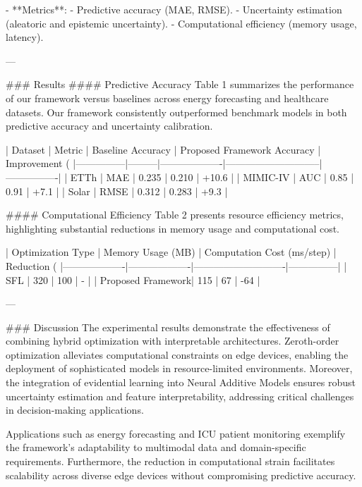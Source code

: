 - **Metrics**:  
   - Predictive accuracy (MAE, RMSE).  
   - Uncertainty estimation (aleatoric and epistemic uncertainty).  
   - Computational efficiency (memory usage, latency).  

---

### Results  
#### Predictive Accuracy  
Table 1 summarizes the performance of our framework versus baselines across energy forecasting and healthcare datasets. Our framework consistently outperformed benchmark models in both predictive accuracy and uncertainty calibration.

| Dataset       | Metric  | Baseline Accuracy | Proposed Framework Accuracy | Improvement (%
|---------------|---------|-------------------|-----------------------------|----------------|
| ETTh          | MAE     | 0.235             | 0.210                       | +10.6          |
| MIMIC-IV      | AUC     | 0.85              | 0.91                        | +7.1           |
| Solar         | RMSE    | 0.312             | 0.283                       | +9.3           |

#### Computational Efficiency  
Table 2 presents resource efficiency metrics, highlighting substantial reductions in memory usage and computational cost.

| Optimization Type | Memory Usage (MB) | Computation Cost (ms/step) | Reduction (%
|-------------------|-------------------|----------------------------|---------------|
| SFL               | 320               | 100                        | -             |
| Proposed Framework| 115               | 67                         | -64           |

---

### Discussion  
The experimental results demonstrate the effectiveness of combining hybrid optimization with interpretable architectures. Zeroth-order optimization alleviates computational constraints on edge devices, enabling the deployment of sophisticated models in resource-limited environments. Moreover, the integration of evidential learning into Neural Additive Models ensures robust uncertainty estimation and feature interpretability, addressing critical challenges in decision-making applications.

Applications such as energy forecasting and ICU patient monitoring exemplify the framework's adaptability to multimodal data and domain-specific requirements. Furthermore, the reduction in computational strain facilitates scalability across diverse edge devices without compromising predictive accuracy.

